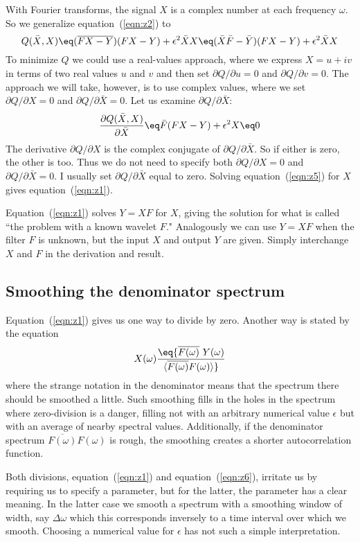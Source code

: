 \par
With Fourier transforms,
the signal $X$ is a complex number at each frequency $\omega$.
So we generalize equation~(\ref{eqn:z2}) to
\begin{equation}
Q(\bar X, X) \eq
(\overline{FX-Y})        (FX-Y) + \epsilon^2 \bar X X \eq
(\bar X \bar F - \bar Y) (FX-Y) + \epsilon^2 \bar X X
\label{eqn:z4}
\end{equation}
To minimize $Q$ we could use a real-values approach,
where we express
$X=u+iv$ in terms of two real values $u$ and $v$
and then set $\partial Q/\partial u=0$ and $\partial Q/\partial v=0$.
The approach we will take, however,
is to use complex values,
where we set
$\partial Q/\partial X=0$ and $\partial Q/\partial \bar X=0$.
Let us examine $\partial Q/\partial \bar X$:
\begin{equation}
{\partial Q(\bar X, X)\over \partial  \bar X}  \eq
\bar F (FX-Y) + \epsilon^2  X  \eq 0
\label{eqn:z5}
\end{equation}
The derivative $\partial Q/\partial X$ is
the complex conjugate of $\partial Q/\partial \bar X$.
So if either is zero, the other is too.
Thus we do not need to specify both
$\partial Q/\partial X=0$ and $\partial Q/\partial \bar X=0$.
I usually set
$\partial Q/\partial \bar X$ equal to zero.
Solving equation~(\ref{eqn:z5}) for $X$
gives equation~(\ref{eqn:z1}).

\par
Equation~(\ref{eqn:z1}) solves $Y=XF$ for $X$,
giving the solution for what is called
``the  problem with a known wavelet $F$."
Analogously we can use $Y=XF$ when the filter $F$ is unknown,
but the input $X$ and output $Y$ are given.
Simply interchange $X$ and $F$ in the derivation and result.

\subsection{Smoothing the denominator spectrum}

\par
Equation~(\ref{eqn:z1}) gives us one way to divide by zero.
Another way is stated by the equation
\begin{equation}
X(\omega) \eq
{ \overline{F(\omega)} \ Y(\omega)  \over 
\langle \overline{F(\omega)} F(\omega) \rangle
}
\label{eqn:z6}
\end{equation}
where the strange notation in the denominator means
that the spectrum there should be smoothed a little.
Such smoothing fills in the holes in the spectrum
where zero-division is a danger,
filling not with an arbitrary numerical value $\epsilon$
but with an average of nearby spectral values.
Additionally, if the denominator spectrum
$\overline{F(\omega)} F(\omega)$ is rough,
the smoothing creates a shorter autocorrelation function.
\par
Both divisions,
equation~(\ref{eqn:z1}) and
equation~(\ref{eqn:z6}),
irritate us by requiring us to specify a parameter,
but for the latter, the parameter has a clear meaning.
In the latter case we smooth a spectrum with a smoothing
window of width, say $\Delta\omega$
which this corresponds inversely to a time interval over which we smooth.
Choosing a numerical value for  $\epsilon$ has not such a simple interpretation.

